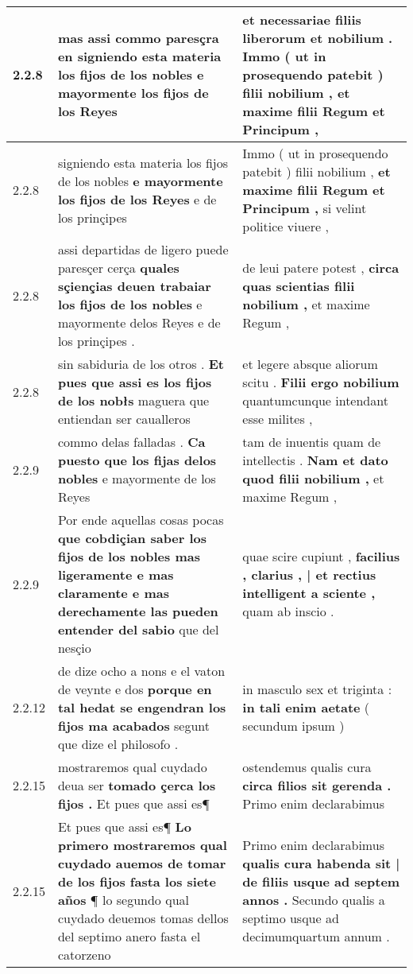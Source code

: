 \begin{tabular}{|p{1cm}|p{6.5cm}|p{6.5cm}|}
2.2.8 & mas assi commo paresçra en \textbf{ signiendo esta materia los fijos de los nobles } e mayormente los fijos de los Reyes & et necessariae filiis liberorum et nobilium . \textbf{ Immo ( ut in prosequendo patebit ) filii nobilium , } et maxime filii Regum et Principum , \\\hline
2.2.8 & signiendo esta materia los fijos de los nobles \textbf{ e mayormente los fijos de los Reyes } e de los prinçipes & Immo ( ut in prosequendo patebit ) filii nobilium , \textbf{ et maxime filii Regum et Principum , } si velint politice viuere , \\\hline
2.2.8 & assi departidas de ligero puede paresçer cerça \textbf{ quales sçiençias deuen trabaiar los fijos de los nobles } e mayormente delos Reyes e de los prinçipes . & de leui patere potest , \textbf{ circa quas scientias filii nobilium , } et maxime Regum , \\\hline
2.2.8 & sin sabiduria de los otros . \textbf{ Et pues que assi es los fijos de los nobłs } maguera que entiendan ser caualleros & et legere absque aliorum scitu . \textbf{ Filii ergo nobilium } quantumcunque intendant esse milites , \\\hline
2.2.9 & commo delas falladas . \textbf{ Ca puesto que los fijas delos nobles } e mayormente de los Reyes & tam de inuentis quam de intellectis . \textbf{ Nam et dato quod filii nobilium , } et maxime Regum , \\\hline
2.2.9 & Por ende aquellas cosas pocas \textbf{ que cobdiçian saber los fijos de los nobles mas ligeramente e mas claramente e mas derechamente las pueden entender del sabio } que del nesçio & quae scire cupiunt , \textbf{ facilius , clarius , | et rectius intelligent a sciente , } quam ab inscio . \\\hline
2.2.12 & de dize ocho a nons e el vaton de veynte e dos \textbf{ porque en tal hedat se engendran los fijos ma acabados } segunt que dize el philosofo . & in masculo sex et triginta : \textbf{ in tali enim aetate } ( secundum ipsum ) \\\hline
2.2.15 & mostraremos qual cuydado deua ser \textbf{ tomado çerca los fijos . } Et pues que assi es¶ & ostendemus qualis cura \textbf{ circa filios sit gerenda . } Primo enim declarabimus \\\hline
2.2.15 & Et pues que assi es¶ \textbf{ Lo primero mostraremos qual cuydado auemos de tomar de los fijos fasta los siete años } ¶ lo segundo qual cuydado deuemos tomas dellos del septimo anero fasta el catorzeno & Primo enim declarabimus \textbf{ qualis cura habenda sit | de filiis usque ad septem annos . } Secundo qualis a septimo usque ad decimumquartum annum . \\\hline

\end{tabular}
